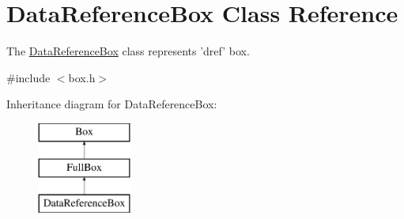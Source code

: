 \hypertarget{class_data_reference_box}{\section{Data\-Reference\-Box Class Reference}
\label{class_data_reference_box}
}


The \hyperlink{class_data_reference_box}{Data\-Reference\-Box} class represents 'dref' box.  




{\ttfamily \#include $<$box.\-h$>$}

Inheritance diagram for Data\-Reference\-Box\-:\begin{figure}[H]
\begin{center}
\leavevmode
\includegraphics[height=3.000000cm]{class_data_reference_box}
\end{center}
\end{figure}

